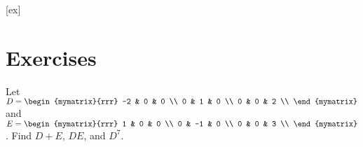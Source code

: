 [ex]
\section*{Exercises}


\begin{ex}
  Let $D=\begin{mymatrix}{rrr}
    -2 & 0 & 0 \\
    0 & 1 & 0 \\
    0 & 0 & 2 \\
  \end{mymatrix}$ and
  $E=\begin{mymatrix}{rrr}
    1 & 0 & 0 \\
    0 & -1 & 0 \\
    0 & 0 & 3 \\
  \end{mymatrix}$.
  Find $D+E$, $DE$, and $D^{7}$.
\end{ex}
  
